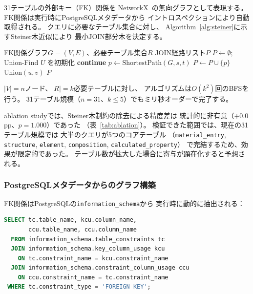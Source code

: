 \documentclass[5p,twocolumn]{elsarticle}
\begin{document}
31テーブルの外部キー（FK）関係を
NetworkX~\cite{networkx2008}の無向グラフとして表現する。
FK関係は実行時にPostgreSQLメタデータから
イントロスペクションにより自動取得される。
クエリに必要なテーブル集合に対し、
Algorithm~\ref{alg:steiner}に示すSteiner木近似により
最小JOIN部分木を決定する。

\begin{algorithm}[htbp]
  \caption{最小被覆JOIN部分グラフ（Steiner木近似）。}
  \label{alg:steiner}
  \begin{algorithmic}[1]
    \Require FK関係グラフ$G = (V, E)$、必要テーブル集合$R$
    \Ensure JOIN経路リスト$P$
    \State $P \gets \emptyset$; Union-Find $U$ を初期化
        \State \textbf{continue}
      \EndIf
      \State $p \gets \text{ShortestPath}(G, s, t)$ 
        \State $P \gets P \cup \{p\}$
          \State $\text{Union}(u, v)$
        \EndFor
      \EndIf
    \EndFor
    \State \Return $P$
  \end{algorithmic}
\end{algorithm}

$|V| = n$ノード、$|R| = k$必要テーブルに対し、
アルゴリズムは$O(k^2)$回のBFSを行う。
31テーブル規模（$n = 31$、$k \leq 5$）でもミリ秒オーダーで完了する。

ablation studyでは、Steiner木制約の除去による精度差は
統計的に非有意（$+$0.0\,pp、$p=1.000$）であった
（表~\ref{tab:ablation}）。
検証できた範囲では、現在の31テーブル規模では
大半のクエリが5つのコアテーブル
（\texttt{material\_entry}, \texttt{structure}, \texttt{element},
\texttt{composition}, \texttt{calculated\_property}）
で完結するため、効果が限定的であった。
テーブル数が拡大した場合に寄与が顕在化すると予想される。

\subsubsection{PostgreSQLメタデータからのグラフ構築}

FK関係はPostgreSQLの\texttt{information\_schema}から
実行時に動的に抽出される：

\begin{lstlisting}[language=SQL,caption={FK関係抽出},label=lst:fk_query,numbers=none]
SELECT tc.table_name, kcu.column_name,
       ccu.table_name, ccu.column_name
  FROM information_schema.table_constraints tc
  JOIN information_schema.key_column_usage kcu
    ON tc.constraint_name = kcu.constraint_name
  JOIN information_schema.constraint_column_usage ccu
    ON ccu.constraint_name = tc.constraint_name
 WHERE tc.constraint_type = 'FOREIGN KEY';
\end{lstlisting}
\end{document}
